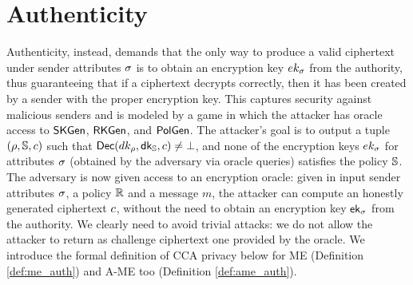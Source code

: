 \section{Authenticity}\label{sec:cca-auth}
Authenticity, instead, demands that the only way to produce a valid ciphertext under sender attributes $\sigma$ is to obtain an encryption key $ek_\sigma$ from the authority, thus guaranteeing that if a ciphertext decrypts correctly, then it has been created by a sender with the proper encryption key. This captures security against malicious senders and is modeled by a game in which the attacker has oracle access to $\mathsf{SKGen}$, $\mathsf{RKGen}$, and $\mathsf{PolGen}$.
The attacker's goal is to output a tuple $(\rho, \mathbb{S}, c)$ such that $\mathsf{Dec}(dk_\rho, \mathsf{dk}_{\mathbb{S}}, c) \not= \bot$, and none of the encryption keys $ek_\sigma$ for attributes $\sigma$ (obtained by the adversary via oracle queries) satisfies the policy $\mathbb{S}$.
\newline\newline
The adversary is now given access to an encryption oracle: given in input sender attributes $\sigma$, a policy $\mathbb{R}$ and a message $m$, the attacker can compute an honestly generated ciphertext $c$, without the need to obtain an encryption key $\mathsf{ek}_\sigma$ from the authority.
We clearly need to avoid trivial attacks: we do not allow the attacker to return as challenge ciphertext one provided by the oracle.
We introduce the formal definition of CCA privacy below for ME (Definition \ref{def:me_auth}) and A-ME too (Definition \ref{def:ame_auth}).




